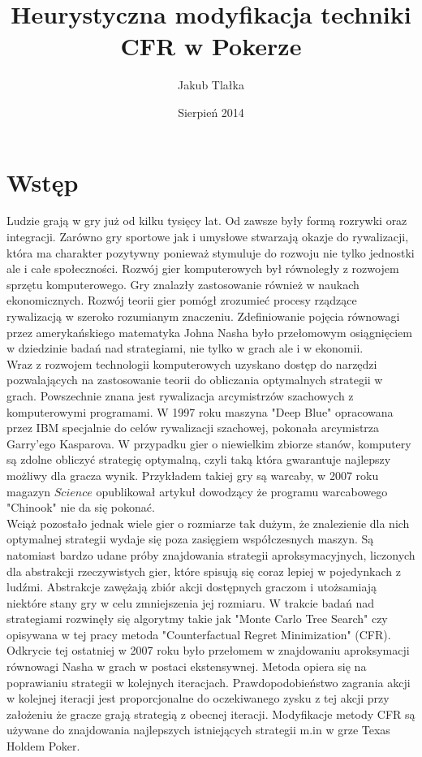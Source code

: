 \documentclass[licencjacka]{pracamgr}
\author{Jakub Tlałka}
\title{Heurystyczna modyfikacja techniki CFR w Pokerze}
\date{Sierpień 2014}
\begin{document}
\maketitle

\begin{abstract}
\end{abstract}

\tableofcontents

\chapter{Wstęp}

\noindent
Ludzie grają w gry już od kilku tysięcy lat. Od zawsze były formą rozrywki oraz integracji.
Zarówno gry sportowe jak i umysłowe stwarzają okazje do rywalizacji, która ma charakter pozytywny ponieważ
stymuluje do rozwoju nie tylko jednostki ale i całe społeczności. Rozwój gier komputerowych był równoległy
z rozwojem sprzętu komputerowego. Gry znalazły zastosowanie również w naukach
ekonomicznych. Rozwój teorii gier pomógł zrozumieć procesy rządzące rywalizacją w szeroko rozumianym
znaczeniu. Zdefiniowanie pojęcia równowagi przez amerykańskiego matematyka Johna Nasha było przełomowym
osiągnięciem w dziedzinie badań nad strategiami, nie tylko w grach ale i w ekonomii. \\

\noindent
Wraz z rozwojem technologii komputerowych uzyskano dostęp do narzędzi pozwalających na zastosowanie
teorii do obliczania optymalnych strategii w grach. Powszechnie znana jest rywalizacja
arcymistrzów szachowych z komputerowymi programami. W 1997 roku maszyna "Deep Blue" opracowana przez IBM
specjalnie do celów rywalizacji szachowej, pokonała arcymistrza Garry'ego Kasparova. W przypadku gier
o niewielkim zbiorze stanów, komputery są zdolne obliczyć strategię optymalną, czyli taką która
gwarantuje najlepszy możliwy dla gracza wynik. Przykładem takiej gry są warcaby, w 2007
roku magazyn $Science$ opublikował artykuł dowodzący że programu warcabowego "Chinook" nie da się pokonać. \\

\noindent
Wciąż pozostało jednak wiele gier o rozmiarze tak dużym, że znalezienie dla nich optymalnej strategii wydaje
się poza zasięgiem współczesnych maszyn. Są natomiast bardzo udane próby znajdowania strategii aproksymacyjnych,
liczonych dla abstrakcji rzeczywistych gier, które spisują się coraz lepiej w pojedynkach z ludźmi.
Abstrakcje zawężają zbiór akcji dostępnych graczom i utożsamiają niektóre stany gry w celu zmniejszenia jej rozmiaru.
W trakcie badań nad strategiami rozwinęły się algorytmy takie jak "Monte Carlo Tree Search" czy opisywana
w tej pracy metoda "Counterfactual Regret Minimization" (CFR). Odkrycie tej ostatniej w 2007 roku\cite{cfr} było przełomem
w znajdowaniu aproksymacji równowagi Nasha w grach w postaci ekstensywnej. Metoda opiera się na poprawianiu strategii w kolejnych
iteracjach. Prawdopodobieństwo zagrania akcji w kolejnej iteracji jest proporcjonalne do oczekiwanego zysku z tej akcji
przy założeniu że gracze grają strategią z obecnej iteracji. Modyfikacje metody CFR są używane
do znajdowania najlepszych istniejących strategii m.in w grze Texas Holdem Poker. \\
\end{document}
